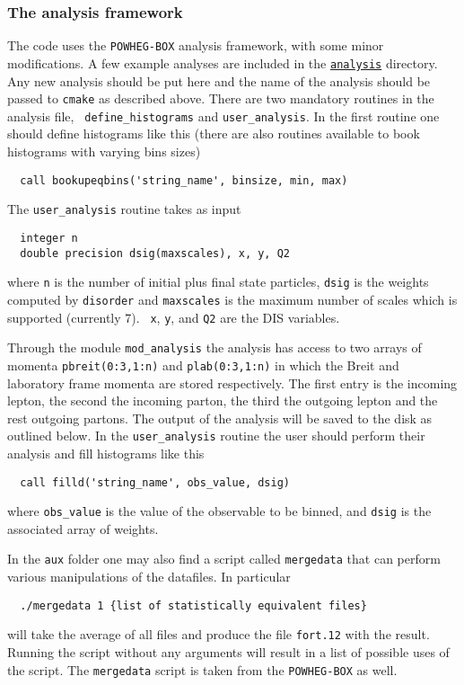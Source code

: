 \documentclass[submission, PhysCodeb]{SciPost_better_arXiv}
\newcommand{\disorder}{{\tt disorder}}
\newcommand{\ttt}[1]{\texttt{#1}}
\newcommand{\repolink}[2]{\href{https://github.com/alexanderkarlberg/disorder/blob/master/#1}{\ttt{#2}}}
\newcommand{\masterlink}[1]{\repolink{#1}{#1}}
\begin{document}
\subsubsection{The analysis framework}
The code uses the {\tt POWHEG-BOX} analysis framework, with some minor
modifications. A few example analyses are included in the \masterlink{analysis} directory. Any new analysis should be put here and the
name of the analysis should be passed to {\tt cmake} as described
above. There are two mandatory routines in the analysis file, {\tt
  define\_histograms} and {\tt user\_analysis}. In the first routine
one should define histograms like this (there are also routines
available to book histograms with varying bins sizes)
\begin{lstlisting}
  call bookupeqbins('string_name', binsize, min, max)
\end{lstlisting}
The {\tt user\_analysis} routine takes as input
\begin{lstlisting}
  integer n
  double precision dsig(maxscales), x, y, Q2
\end{lstlisting}
where {\tt n} is the number of initial plus final state particles,
{\tt dsig} is the weights computed by \disorder{} and {\tt maxscales}
is the maximum number of scales which is supported (currently 7). {\tt
  x}, {\tt y}, and {\tt Q2} are the DIS variables.

Through the module {\tt mod\_analysis} the analysis has access to two
arrays of momenta {\tt pbreit(0:3,1:n)} and {\tt plab(0:3,1:n)} in
which the Breit and laboratory frame momenta are stored
respectively. The first entry is the incoming lepton, the second the
incoming parton, the third the outgoing lepton and the rest outgoing
partons. The output of the analysis will be saved to the disk as
outlined below.  In the {\tt user\_analysis} routine the user should
perform their analysis and fill histograms like this
\begin{lstlisting}
  call filld('string_name', obs_value, dsig)
\end{lstlisting}
where {\tt obs\_value} is the value of the observable to be binned, and
{\tt dsig} is the associated array of weights. 

In the {\tt aux} folder one may also find a
script called {\tt mergedata} that can perform various manipulations
of the datafiles. In particular
\begin{lstlisting}
  ./mergedata 1 {list of statistically equivalent files}
\end{lstlisting}
will take the average of all files and produce the file {\tt fort.12}
with the result. Running the script without any arguments will result
in a list of possible uses of the script. The {\tt mergedata} script
is taken from the {\tt POWHEG-BOX} as well.
\end{document}
